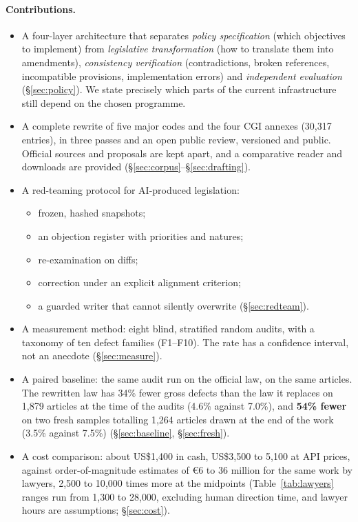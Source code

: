 \documentclass[11pt,a4paper]{article}
\begin{document}
\paragraph{Contributions.}
\begin{itemize}
  \item A four-layer architecture that separates \emph{policy specification} (which objectives to implement) from \emph{legislative transformation} (how to translate them into amendments), \emph{consistency verification} (contradictions, broken references, incompatible provisions, implementation errors) and \emph{independent evaluation} (\S\ref{sec:policy}). We state precisely which parts of the current infrastructure still depend on the chosen programme.
  \item A complete rewrite of five major codes and the four CGI annexes (30{,}317 entries), in three passes and an open public review, versioned and public. Official sources and proposals are kept apart, and a comparative reader and downloads are provided (\S\ref{sec:corpus}--\S\ref{sec:drafting}).
  \item A red-teaming protocol for AI-produced legislation:
  \begin{itemize}
    \item frozen, hashed snapshots;
    \item an objection register with priorities and natures;
    \item re-examination on diffs;
    \item correction under an explicit alignment criterion;
    \item a guarded writer that cannot silently overwrite (\S\ref{sec:redteam}).
  \end{itemize}
  \item A measurement method: eight blind, stratified random audits, with a taxonomy of ten defect families (F1--F10). The rate has a confidence interval, not an anecdote (\S\ref{sec:measure}).
  \item A paired baseline: the same audit run on the official law, on the same articles. The rewritten law has 34\% fewer gross defects than the law it replaces on 1{,}879 articles at the time of the audits (4.6\% against 7.0\%), and \textbf{54\% fewer} on two fresh samples totalling 1{,}264 articles drawn at the end of the work (3.5\% against 7.5\%) (\S\ref{sec:baseline}, \S\ref{sec:fresh}).
  \item A cost comparison: about US\$1{,}400 in cash, US\$3{,}500 to 5{,}100 at API prices, against order-of-magnitude estimates of \euro{}6 to 36 million for the same work by lawyers, 2{,}500 to 10{,}000 times more at the midpoints (Table~\ref{tab:lawyers} ranges run from 1{,}300 to 28{,}000, excluding human direction time, and lawyer hours are assumptions; \S\ref{sec:cost}).

\end{itemize}
\end{document}
